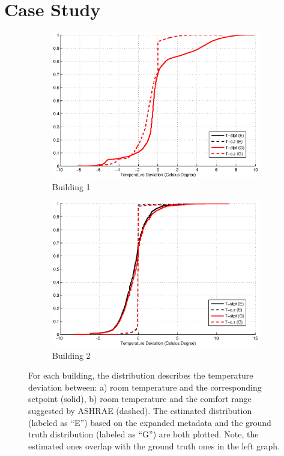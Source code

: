 \section{Case Study}

\begin{figure}[ht!]
\centering
	\begin{subfigure}{0.48\textwidth}
                \centering
		\includegraphics[width=\textwidth]{./figs/soda_cmp.eps}
                \caption{Building 1}
	\end{subfigure}
	\begin{subfigure}{0.48\textwidth}
                \centering
		\includegraphics[width=\textwidth]{./figs/sdh_cmp.eps}
                \caption{Building 2}
	\end{subfigure}
\caption{For each building, the distribution describes the temperature deviation between: a) room temperature and the corresponding setpoint (solid), b) room temperature and the comfort range suggested by ASHRAE (dashed). The estimated distribution (labeled as ``E'') based on the expanded metadata and the ground truth distribution (labeled as ``G'') are both plotted. Note, the estimated ones overlap with the ground truth ones in the left graph.}
\label{fig:cdf_temp}
\end{figure}

